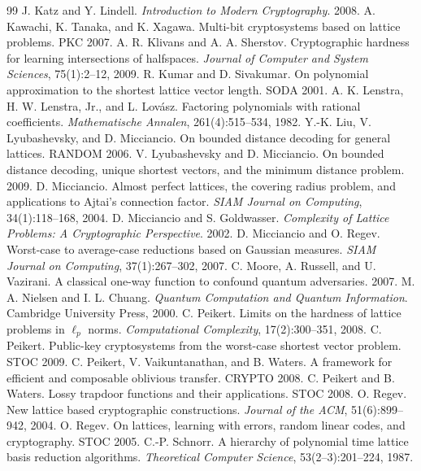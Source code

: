 \documentclass[11pt,a4paper]{article}
\begin{document}
\begin{thebibliography}{99}
 J. Katz and Y. Lindell. \textit{Introduction to Modern Cryptography}. 2008.
 A. Kawachi, K. Tanaka, and K. Xagawa. Multi-bit cryptosystems based on lattice problems. PKC 2007.
 A. R. Klivans and A. A. Sherstov. Cryptographic hardness for learning intersections of halfspaces. \textit{Journal of Computer and System Sciences}, 75(1):2--12, 2009.
 R. Kumar and D. Sivakumar. On polynomial approximation to the shortest lattice vector length. SODA 2001.
 A. K. Lenstra, H. W. Lenstra, Jr., and L. Lovász. Factoring polynomials with rational coefficients. \textit{Mathematische Annalen}, 261(4):515--534, 1982.
 Y.-K. Liu, V. Lyubashevsky, and D. Micciancio. On bounded distance decoding for general lattices. RANDOM 2006.
 V. Lyubashevsky and D. Micciancio. On bounded distance decoding, unique shortest vectors, and the minimum distance problem. 2009.
 D. Micciancio. Almost perfect lattices, the covering radius problem, and applications to Ajtai's connection factor. \textit{SIAM Journal on Computing}, 34(1):118--168, 2004.
 D. Micciancio and S. Goldwasser. \textit{Complexity of Lattice Problems: A Cryptographic Perspective}. 2002.
 D. Micciancio and O. Regev. Worst-case to average-case reductions based on Gaussian measures. \textit{SIAM Journal on Computing}, 37(1):267--302, 2007.
 C. Moore, A. Russell, and U. Vazirani. A classical one-way function to confound quantum adversaries. 2007.
 M. A. Nielsen and I. L. Chuang. \textit{Quantum Computation and Quantum Information}. Cambridge University Press, 2000.
 C. Peikert. Limits on the hardness of lattice problems in $\ell_{p}$ norms. \textit{Computational Complexity}, 17(2):300--351, 2008.
 C. Peikert. Public-key cryptosystems from the worst-case shortest vector problem. STOC 2009.
 C. Peikert, V. Vaikuntanathan, and B. Waters. A framework for efficient and composable oblivious transfer. CRYPTO 2008.
 C. Peikert and B. Waters. Lossy trapdoor functions and their applications. STOC 2008.
 O. Regev. New lattice based cryptographic constructions. \textit{Journal of the ACM}, 51(6):899--942, 2004.
 O. Regev. On lattices, learning with errors, random linear codes, and cryptography. STOC 2005.
 C.-P. Schnorr. A hierarchy of polynomial time lattice basis reduction algorithms. \textit{Theoretical Computer Science}, 53(2--3):201--224, 1987.

\end{thebibliography}
\end{document}
